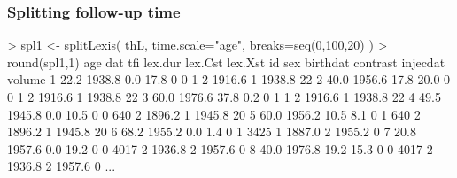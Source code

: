 \begin{frame}[fragile]
  \frametitle{Splitting follow-up time}
\footnotesize
\renewcommand{\baselinestretch}{0.9}
\begin{semiverbatim}
> spl1 <- splitLexis( thL, time.scale="age", breaks=seq(0,100,20) )
> round(spl1,1)
   age    dat  tfi lex.dur lex.Cst lex.Xst   id sex birthdat contrast injecdat volume
\alert<2>{1 22.2 1938.8  0.0    17.8       0       0    1   2   1916.6        1   1938.8     22}
\alert<2>{2 40.0 1956.6 17.8    20.0       0       0    1   2   1916.6        1   1938.8     22}
\alert<2>{3 60.0 1976.6 37.8     0.2       0       1    1   2   1916.6        1   1938.8     22}
\alert<3>{4 49.5 1945.8  0.0    10.5       0       0  640   2   1896.2        1   1945.8     20}
\alert<3>{5 60.0 1956.2 10.5     8.1       0       1  640   2   1896.2        1   1945.8     20}
\alert<4>{6 68.2 1955.2  0.0     1.4       0       1 3425   1   1887.0        2   1955.2      0}
\alert<5>{7 20.8 1957.6  0.0    19.2       0       0 4017   2   1936.8        2   1957.6      0}
\alert<5>{8 40.0 1976.8 19.2    15.3       0       0 4017   2   1936.8        2   1957.6      0}
...
\end{semiverbatim}
\renewcommand{\baselinestretch}{1.0}

\end{frame}

